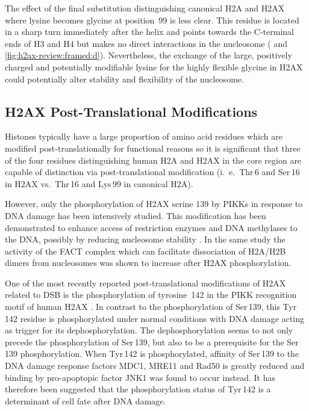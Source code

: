 The effect of the final substitution distinguishing canonical H2A and
H2AX where lysine becomes glycine at position~99 is less clear. This
residue is located in a sharp turn immediately after the 
helix and points towards the C-terminal ends of H3 and H4 but makes
no direct interactions in the nucleosome
( and
\ref{fig:h2ax-review:framed:d}). Nevertheless, the exchange of the
large, positively charged and potentially modifiable lysine for the
highly flexible glycine in H2AX could potentially alter stability and
flexibility of the nucleosome.

\subsection{H2AX Post-Translational Modifications}
\label{subsec:h2ax-review:H2AX-PTM}
Histones typically have a large proportion of amino acid residues
which are modified post-translationally for functional reasons so it
is significant that three of the four residues distinguishing human
H2A and H2AX in the core region are capable of distinction via
post-translational modification (i.~e.\ Thr\,6 and Ser\,16 in H2AX
vs.\ Thr\,16 and Lys\,99 in canonical H2A).

However, only the phosphorylation of H2AX serine 139 by PIKKs in
response to DNA damage has been intensively studied. This modification
has been demonstrated to enhance access of restriction enzymes and DNA
methylases to the DNA, possibly by reducing nucleosome stability
\citep{KHHK+08}. In the same study the activity of the FACT complex
which can facilitate dissociation of H2A/H2B dimers from nucleosomes
was shown to increase after H2AX phosphorylation.

One of the most recently reported post-translational modifications of
H2AX related to DSB is the phosphorylation of tyrosine~142 in the PIKK
recognition motif of human H2AX \citep{XLS+09,CJT+09}. In contrast to
the phosphorylation of Ser\,139, this Tyr\,142 residue is
phosphorylated under normal conditions with DNA damage acting as
trigger for its dephosphorylation. The dephosphorylation seems to not
only precede the phosphorylation of Ser\,139, but also to be a
prerequisite for the Ser\,139 phosphorylation. When Tyr\,142 is
phosphorylated, affinity of Ser\,139 to the DNA damage response
factors MDC1, MRE11 and Rad50 is greatly reduced and binding by
pro-apoptopic factor JNK1 was found to occur instead. It has therefore
been suggested that the phosphorylation status of Tyr\,142 is a
determinant of cell fate after DNA damage.

